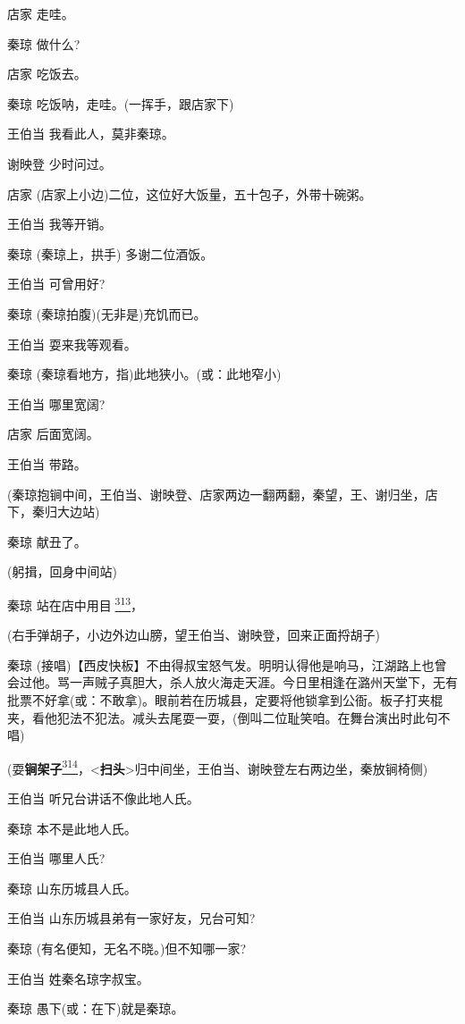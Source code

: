 店家 走哇。

秦琼 做什么?

店家 吃饭去。

秦琼 吃饭呐，走哇。(一挥手，跟店家下)

王伯当 我看此人，莫非秦琼。

谢映登 少时问过。

店家 (店家上小边)二位，这位好大饭量，五十包子，外带十碗粥。

王伯当 我等开销。

秦琼 (秦琼上，拱手) 多谢二位酒饭。

王伯当 可曾用好?

秦琼 (秦琼拍腹)(无非是)充饥而已。

王伯当 耍来我等观看。

秦琼 (秦琼看地方，指)此地狭小。(或：此地窄小)

王伯当 哪里宽阔?

店家 后面宽阔。

王伯当 带路。

(秦琼抱锏中间，王伯当、谢映登、店家两边一翻两翻，秦望，王、谢归坐，店下，秦归大边站)

秦琼 献丑了。

(躬揖，回身中间站)

秦琼
站在店中用目{\fzsong 𥋌}\protect\hyperlink{fn313}{\textsuperscript{313}}，

(右手弹胡子，小边外边山膀，望王伯当、谢映登，回来正面捋胡子)

秦琼
(接唱)【西皮快板】不由得叔宝怒气发。明明认得他是响马，江湖路上也曾会过他。骂一声贼子真胆大，杀人放火海走天涯。今日里相逢在潞州天堂下，无有批票不好拿(或：不敢拿)。眼前若在历城县，定要将他锁拿到公衙。板子打夹棍夹，看他犯法不犯法。减头去尾耍一耍，(倒叫二位耻笑咱。在舞台演出时此句不唱)

(耍\textbf{锏架子}\protect\hyperlink{fn314}{\textsuperscript{314}}，\textless{}\textbf{扫头}\textgreater{}归中间坐，王伯当、谢映登左右两边坐，秦放锏椅侧)

王伯当 听兄台讲话不像此地人氏。

秦琼 本不是此地人氏。

王伯当 哪里人氏?

秦琼 山东历城县人氏。

王伯当 山东历城县弟有一家好友，兄台可知?

秦琼 (有名便知，无名不晓。)但不知哪一家?

王伯当 姓秦名琼字叔宝。

秦琼 愚下(或：在下)就是秦琼。

